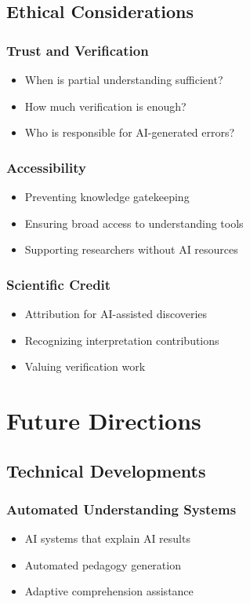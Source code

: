\documentclass[11pt,a4paper]{article}
\begin{document}
\subsection{Ethical Considerations}

\subsubsection{Trust and Verification}
\begin{itemize}
\item When is partial understanding sufficient?
\item How much verification is enough?
\item Who is responsible for AI-generated errors?
\end{itemize}

\subsubsection{Accessibility}
\begin{itemize}
\item Preventing knowledge gatekeeping
\item Ensuring broad access to understanding tools
\item Supporting researchers without AI resources
\end{itemize}

\subsubsection{Scientific Credit}
\begin{itemize}
\item Attribution for AI-assisted discoveries
\item Recognizing interpretation contributions
\item Valuing verification work
\end{itemize}

\section{Future Directions}

\subsection{Technical Developments}

\subsubsection{Automated Understanding Systems}
\begin{itemize}
\item AI systems that explain AI results
\item Automated pedagogy generation
\item Adaptive comprehension assistance
\end{itemize}
\end{document}
